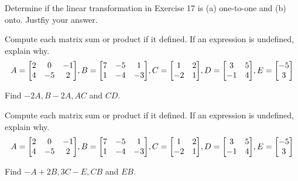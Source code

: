 \documentclass{../mathhomework}
\newenvironment{Mat}{\begin{bmatrix}}{\end{bmatrix}}
\begin{document}
\begin{problem}[1.9\#25]
    Determine if the linear transformation in Exercise 17 is (a) one-to-one and (b) onto. Justfiy your answer.
\end{problem}



\begin{problem}[2.1\#1]
    Compute each matrix sum or product if it defined. If an expression is undefined, explain why.
    \begin{equation*}
        A = \begin{Mat}
            2 & 0 & -1 \\ 
            4 & -5 & 2
        \end{Mat}, B = \begin{Mat}
            7 & -5 & 1 \\ 
            1 & -4 & -3
        \end{Mat}, C = \begin{Mat}
            1 & 2 \\ 
            -2 & 1
        \end{Mat}, D = \begin{Mat}
            3 & 5 \\ 
            -1 & 4
        \end{Mat}, E = \begin{Mat}
            -5 \\ 3
        \end{Mat}
    \end{equation*}

    Find $-2A, B - 2A, AC$ and $CD$.
\end{problem}

\begin{problem}[2.1\#2]
    Compute each matrix sum or product if it defined. If an expression is undefined, explain why.
    \begin{equation*}
        A = \begin{Mat}
            2 & 0 & -1 \\ 
            4 & -5 & 2
        \end{Mat}, B = \begin{Mat}
            7 & -5 & 1 \\ 
            1 & -4 & -3
        \end{Mat}, C = \begin{Mat}
            1 & 2 \\ 
            -2 & 1
        \end{Mat}, D = \begin{Mat}
            3 & 5 \\ 
            -1 & 4
        \end{Mat}, E = \begin{Mat}
            -5 \\ 3
        \end{Mat}
    \end{equation*}

    Find $-A + 2B, 3C - E, CB$ and $EB$.
\end{problem}
\end{document}
